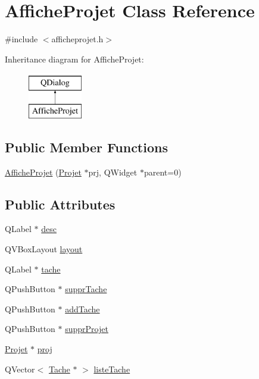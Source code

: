 \hypertarget{class_affiche_projet}{}\section{Affiche\+Projet Class Reference}
\label{class_affiche_projet}


{\ttfamily \#include $<$afficheprojet.\+h$>$}

Inheritance diagram for Affiche\+Projet\+:\begin{figure}[H]
\begin{center}
\leavevmode
\includegraphics[height=2.000000cm]{class_affiche_projet}
\end{center}
\end{figure}
\subsection*{Public Member Functions}
\begin{DoxyCompactItemize}
\item 
\hyperlink{class_affiche_projet_a70fd692a8fa98b8ba4775b751aec32b4}{Affiche\+Projet} (\hyperlink{class_projet}{Projet} $\ast$prj, Q\+Widget $\ast$parent=0)
\end{DoxyCompactItemize}
\subsection*{Public Attributes}
\begin{DoxyCompactItemize}
\item 
Q\+Label $\ast$ \hyperlink{class_affiche_projet_a1f045e44347cb1c7dcac4574ac6cc659}{desc}
\item 
Q\+V\+Box\+Layout \hyperlink{class_affiche_projet_aeb93cb09a342e264154441f0cddfdad6}{layout}
\item 
Q\+Label $\ast$ \hyperlink{class_affiche_projet_a7b1ce18fafcef5c06ab6dbdd3b280941}{tache}
\item 
Q\+Push\+Button $\ast$ \hyperlink{class_affiche_projet_a8d2f2231e11b6a9eac001827dcbb0d9b}{suppr\+Tache}
\item 
Q\+Push\+Button $\ast$ \hyperlink{class_affiche_projet_ac1789ddd1918a1b59929920ec55e4ea6}{add\+Tache}
\item 
Q\+Push\+Button $\ast$ \hyperlink{class_affiche_projet_a98651088ef2e830bd134fce0b5122873}{suppr\+Projet}
\item 
\hyperlink{class_projet}{Projet} $\ast$ \hyperlink{class_affiche_projet_ac4a83778b0cfb7813b198cd35aafb404}{proj}
\item 
Q\+Vector$<$ \hyperlink{class_tache}{Tache} $\ast$ $>$ \hyperlink{class_affiche_projet_ac6269d456e34393394b0bfced3c88ec2}{liste\+Tache}
\end{DoxyCompactItemize}
